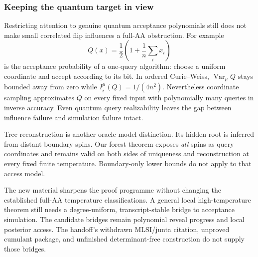\subsubsection{Keeping the quantum target in view}

Restricting attention to genuine quantum acceptance polynomials still
does not make small correlated flip influences a full-AA obstruction.
For example
\[
 Q(x)=\frac12\left(1+\frac1n\sum_i x_i\right)
\]
is the acceptance probability of a one-query algorithm: choose a
uniform coordinate and accept according to its bit. In ordered
Curie--Weiss, $\operatorname{Var}_\mu Q$ stays bounded away from zero
while $I_i^\mu(Q)=1/(4n^2)$. Nevertheless coordinate sampling
approximates $Q$ on every fixed input with polynomially many queries
in inverse accuracy. Even quantum query realizability leaves the gap
between influence failure and simulation failure intact.

Tree reconstruction is another oracle-model distinction. Its hidden
root is inferred from distant boundary spins. Our forest theorem exposes
\emph{all} spins as query coordinates and remains valid on both sides
of uniqueness and reconstruction at every fixed finite temperature.
Boundary-only lower bounds do not apply to that access model.

The new material sharpens the proof programme without changing the
established full-AA temperature classifications. A general local
high-temperature theorem still needs a degree-uniform,
transcript-stable bridge to acceptance simulation. The candidate
bridges remain polynomial reveal progress and local posterior access.
The handoff's withdrawn MLSI/junta citation, unproved cumulant package,
and unfinished determinant-free construction do not supply those bridges.
